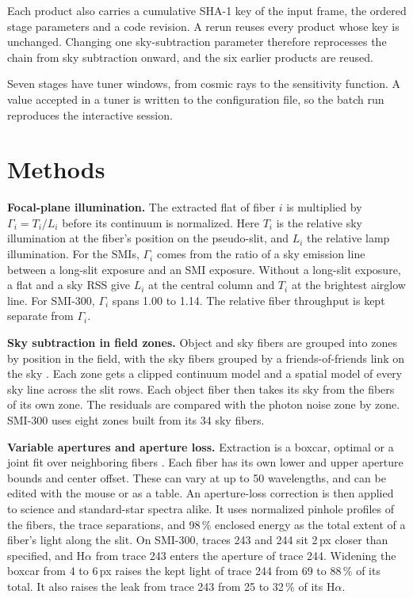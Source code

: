 \documentclass[11pt,twoside]{article}
\begin{document}
Each product also carries a cumulative SHA-1 key of the input frame, the ordered stage parameters and a code revision. A rerun reuses every product whose key is unchanged. Changing one sky-subtraction parameter therefore reprocesses the chain from sky subtraction onward, and the six earlier products are reused.

Seven stages have tuner windows, from cosmic rays to the sensitivity function. A value accepted in a tuner is written to the configuration file, so the batch run reproduces the interactive session.

\section{Methods}

\textbf{Focal-plane illumination.} The extracted flat of fiber $i$ is multiplied by $\Gamma_i = T_i / L_i$ before its continuum is normalized. Here $T_i$ is the relative sky illumination at the fiber's position on the pseudo-slit, and $L_i$ the relative lamp illumination. For the SMIs, $\Gamma_i$ comes from the ratio of a sky emission line between a long-slit exposure and an SMI exposure. Without a long-slit exposure, a flat and a sky RSS give $L_i$ at the central column and $T_i$ at the brightest airglow line. For SMI-300, $\Gamma_i$ spans 1.00 to 1.14. The relative fiber throughput is kept separate from $\Gamma_i$.

\textbf{Sky subtraction in field zones.} Object and sky fibers are grouped into zones by position in the field, with the sky fibers grouped by a friends-of-friends link on the sky \citep{1982ApJ...257..423H}. Each zone gets a clipped continuum model and a spatial model of every sky line across the slit rows. Each object fiber then takes its sky from the fibers of its own zone. The residuals are compared with the photon noise zone by zone. SMI-300 uses eight zones built from its 34 sky fibers.

\textbf{Variable apertures and aperture loss.} Extraction is a boxcar, optimal \citep{1986PASP...98..609H} or a joint fit over neighboring fibers \citep{2010PASA...27...91S}. Each fiber has its own lower and upper aperture bounds and center offset. These can vary at up to 50 wavelengths, and can be edited with the mouse or as a table. An aperture-loss correction is then applied to science and standard-star spectra alike. It uses normalized pinhole profiles of the fibers, the trace separations, and 98\,\% enclosed energy as the total extent of a fiber's light along the slit. On SMI-300, traces 243 and 244 sit 2\,px closer than specified, and H$\alpha$ from trace 243 enters the aperture of trace 244. Widening the boxcar from 4 to 6\,px raises the kept light of trace 244 from 69 to 88\,\% of its total. It also raises the leak from trace 243 from 25 to 32\,\% of its H$\alpha$.
\end{document}
